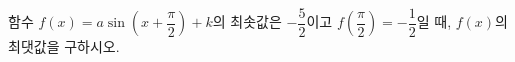함수 $f(x)=a\sin\left(x+\dfrac{\pi}{2}\right)+k$의 최솟값은 $-\dfrac{5}{2}$이고 $f\left(\dfrac{\pi}{2}\right)=-\dfrac{1}{2}$일 때, $f(x)$의 최댓값을 구하시오. 
